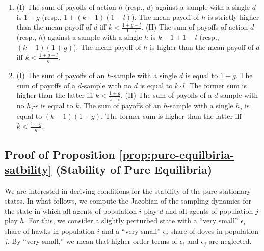 \documentclass[12pt]{article}
\numberwithin{equation}{section}
\numberwithin{figure}{section}
\theoremstyle{definition}
\theoremstyle{plain}
\theoremstyle{plain}
\theoremstyle{plain}
\theoremstyle{remark}
\theoremstyle{plain}
\theoremstyle{plain}
\begin{document}
\begin{enumerate}
\item (I) The sum of payoffs of action $h$ (resp., $d$) against
a sample with a single $d$ is $1+g$ (resp., $1+\left(k-1\right)(1-l)$).
The mean payoff of $h$ is strictly higher than 
the mean payoff of $d$ iff
$k<\frac{1+g-l}{1-l}.$
(II) The sum of payoffs of action $d$ (resp., $h$) against
a sample with a single $h$ is $k-1+1-l$ (resp., $\left(k-1\right)\left(1+g\right)$).
The mean payoff of $h$ is higher than 
the mean payoff of $d$ iff $k<\frac{1+g-l}{g}$. 
\item (I) The sum of payoffs of an $h$-sample with a single $d$ is equal to $1+g$. The sum of payoffs of a $d$-sample with no $d$ is equal to $k\cdot l$. The former sum is
higher than the latter iff $k<\frac{1+g}{1-l}.$
(II) The sum of payoffs of a $d$-sample with no $h_{j}$-s is
equal to $k$. The sum of payoffs of an $h$-sample with a single
$h_{j}$ is equal to $(k-1)\left(1+g\right)$. The former sum
is higher than the latter iff $k<\frac{1+g}{g}$.\qedhere
\end{enumerate}




\subsection {Proof of Proposition \ref{prop:pure-equilbiria-satbility} (Stability of Pure Equilibria)}\label{subsec:Proof-of-Theorem-2}
We are interested in deriving conditions for the stability of the pure stationary states. 
In what follows,
we compute the Jacobian of the sampling dynamics for the state 
in which all agents of population $i$ play $d$ and all agents of population $j$ play $h$. For this, we consider a slightly perturbed state with a ``very small'' $\epsilon_i$ share of hawks in population $i$ and a ``very small'' $\epsilon_j$ share of doves in population $j.$ By ``very small,'' we mean that higher-order terms of $\epsilon_i$ and $\epsilon_j$ are neglected.
\end{document}
